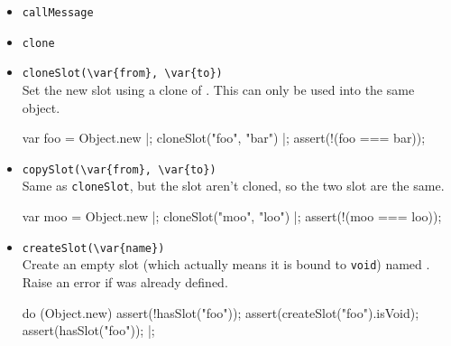 \begin{itemize}
\item \lstinline|callMessage|\\

\item \lstinline|clone|\\

\item \lstinline|cloneSlot(\var{from}, \var{to})|\\
  Set the new slot  using a clone of . This can only
  be used into the same object.

\begin{urbiscript}[firstnumber=last]
var foo = Object.new |;
cloneSlot("foo", "bar") |;
assert(!(foo === bar));
\end{urbiscript}

\item \lstinline|copySlot(\var{from}, \var{to})|\\
  Same as \lstinline|cloneSlot|, but the slot aren't cloned, so the
  two slot are the same.

\begin{urbiscript}[firstnumber=last]
var moo = Object.new |;
cloneSlot("moo", "loo") |;
assert(!(moo === loo));
\end{urbiscript}

\item \lstinline|createSlot(\var{name})|\\
  Create an empty slot (which actually means it is bound to
  \lstinline|void|) named .  Raise an error if 
  was already defined.
\begin{urbiscript}[firstnumber=last]
do (Object.new)
{
  assert(!hasSlot("foo"));
  assert(createSlot("foo").isVoid);
  assert(hasSlot("foo"));
}|;
\end{urbiscript}


\end{itemize}
